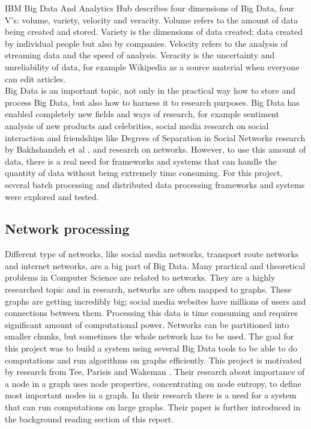 \documentclass{article}
\theoremstyle{definition}
\begin{document}
IBM Big Data And Analytics Hub describes four dimensions of Big Data, four V's: volume, variety, velocity and veracity. Volume refers to the amount of data being created and stored. Variety is the dimensions of data created; data created by individual people but also by companies. Velocity refers to the analysis of streaming data and the speed of analysis. Veracity is the uncertainty and unreliability of data, for example Wikipedia as a source material when everyone can edit articles. \\

Big Data is an important topic, not only in the practical way how to store and process Big Data, but also how to harness it to research purposes. Big Data has enabled completely new fields and ways of research, for example sentiment analysis of new products and celebrities, social media research on social interaction and friendships like Degrees of Separation in Social Networks research by Bakhshandeh et al \cite{sixdegrees}, and research on networks. However, to use this amount of data, there is a real need for frameworks and systems that can handle the quantity of data without being extremely time consuming. For this project, several batch processing and distributed data processing frameworks and systems were explored and tested. \\

\subsection{Network processing}
Different type of networks, like social media networks, transport route networks and internet networks, are a big part of Big Data. Many practical and theoretical problems in Computer Science are related to networks. They are a highly researched topic and in research, networks are often mapped to graphs. These graphs are getting incredibly big; social media websites have millions of users and connections between them. Processing this data is time consuming and requires significant amount of computational power. Networks can be partitioned into smaller chunks, but sometimes the whole network has to be used. The goal for this project was to build a system using several Big Data tools to be able to do computations and run algorithms on graphs efficiently. This project is motivated by research from Tee, Parisis and Wakeman \cite{Tee2016b}. Their research about importance of a node in a graph uses node properties, concentrating on node entropy, to define most important nodes in a graph. In their research there is a need for a system that can run computations on large graphs. Their paper is further introduced in the background reading section of this report. \\
\end{document}
